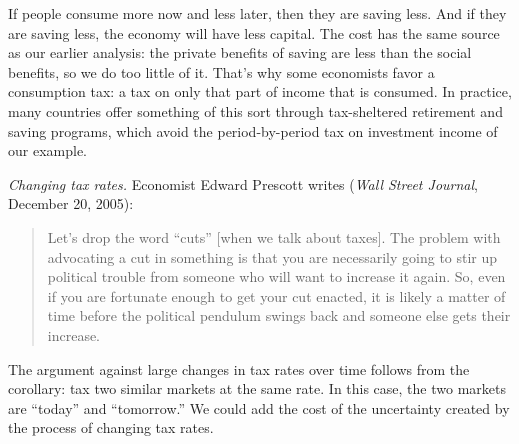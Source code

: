 \documentclass[letterpaper,12pt]{article}
\begin{document}
If people consume more now and less later, then
they are saving less.
And if they are saving less,
the economy will have less capital.
The cost has the same source as our earlier analysis:
the private benefits of saving are less than the social benefits,
so we do too little of it.
That's why some economists favor a consumption tax:  a tax on only
that part of income that is consumed.
In practice, many countries offer something of this sort
through tax-sheltered retirement and saving programs,
which avoid the period-by-period tax on investment income
of our example.


\begin{comment}
{\it Taxes on labor income.\/}
In our diagram, a tax on labor (collected from either firms or workers)
would discourage work in the same way it discourages other activities
(see Figure \ref{fig:tax}).
The issue here is how sensitive labor supply is to the tax rate.
If people work the same amount whether the tax rate is high or low,
then the social cost is zero.
If they work less when the tax is higher, then the cost is positive.
Generally the flatter the supply curve the higher the cost.
You can show this in the figure, but it takes good draftsmanship.

How sensitive is labor supply?  Somewhat.
The most sensitive components of labor supply
seem to be spouses in two-income households
(does one stay home, or take early retirement?)
and poor people (many of whom would lose
means-tested benefits if they worked).
\end{comment}


{\it Changing tax rates.\/}
Economist Edward Prescott writes
({\it Wall Street Journal\/}, December 20, 2005):
%
\begin{quote}
Let's drop the word ``cuts'' [when we talk about taxes].  The problem with advocating a cut in something is that you are necessarily going to stir up political trouble from someone who will want to increase it again.  So, even if you are fortunate enough to get your cut enacted, it is likely a matter of time before the political pendulum swings back and someone else gets their increase. \end{quote}
%
The argument against large changes in tax rates over time
follows from the corollary:  tax two similar markets at the same rate.
In this case, the two markets are ``today'' and ``tomorrow.''
We could add the cost of the uncertainty created
by the process of changing tax rates.
\end{document}
